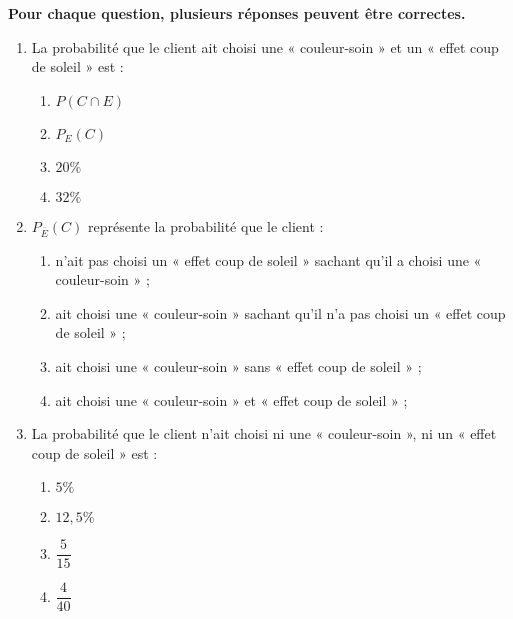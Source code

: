 \documentclass[a4paper,11pt,eval]{nsi}
\begin{document}
\textbf{Pour chaque question, plusieurs réponses peuvent être correctes.}
\begin{enumerate}
    \item La probabilité que le client ait choisi une « couleur-soin » et un « effet coup de soleil » est :
    \begin{multicols}{4}
        \begin{enumerate}[label=\ding{111}]
            \item $P(C \cap E)$
            \item $P_E(C)$
            \item $20\%$
            \item $32\%$
        \end{enumerate}
    \end{multicols}

    \item $P_{\overline{E}}(C)$ représente la probabilité que le client :
    \begin{enumerate}[label=\ding{111}]
        \item n'ait pas choisi un « effet coup de soleil » sachant qu'il a choisi une « couleur-soin » ;
        \item ait choisi une « couleur-soin » sachant qu'il n'a pas choisi un « effet coup de soleil » ;
        \item ait  choisi une « couleur-soin » sans « effet coup de soleil » ;
        \item ait  choisi une « couleur-soin » et « effet coup de soleil » ;
    \end{enumerate}

    \item La probabilité que le client n'ait choisi ni une « couleur-soin », ni un « effet coup de soleil » est :
    \begin{multicols}{4}
        \begin{enumerate}[label=\ding{111}]
            \item $5 \%$
            \item $12,5 \%$
            \item $\dfrac{5}{15}$
            \item $\dfrac{4}{40}$
        \end{enumerate}
    \end{multicols}
\end{enumerate}


\newpage
\end{document}
